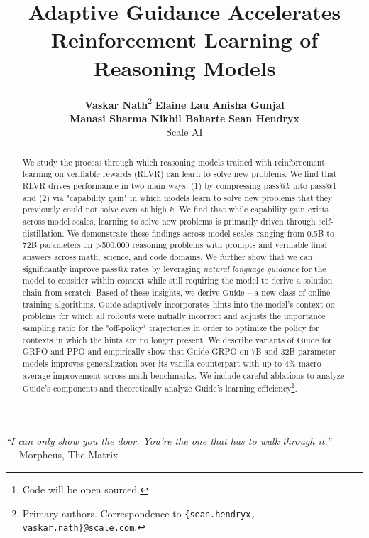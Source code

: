 \documentclass{article}
\title{Adaptive Guidance Accelerates Reinforcement Learning of Reasoning Models}
\author{%
  \textbf{Vaskar Nath}\thanks{Primary authors. Correspondence to \texttt{\{sean.hendryx, vaskar.nath\}@scale.com}.}\quad
  \textbf{Elaine Lau}\quad
  \textbf{Anisha Gunjal}\\[3pt]
  \textbf{Manasi Sharma}\quad
  \textbf{Nikhil Baharte}\quad
  \textbf{Sean Hendryx}\footnotemark[1]\\[6pt]
  Scale AI
}
\begin{document}
\maketitle

\begin{abstract}
   We study the process through which reasoning models trained with reinforcement learning on verifiable rewards (RLVR) can learn to solve new problems. We find that RLVR drives performance in two main ways:
   (1) by compressing pass@$k$ into pass@1 and (2) via "capability gain" in which models learn to solve new problems that they previously could not solve even at high $k$. We find that while capability gain exists across model scales, learning to solve new problems is primarily driven through self-distillation. We demonstrate these findings across model scales ranging from 0.5B to 72B parameters on >500,000 reasoning problems with prompts and verifiable final answers across math, science, and code domains. We further show that we can significantly improve pass@$k$ rates by leveraging \textit{natural language guidance} for the model to consider within context while still requiring the model to derive a solution chain from scratch. 
   Based of these insights, we derive $\text{Guide}$ -- a new class of online training algorithms. 
   $\text{Guide}$ adaptively incorporates hints into the model's context on problems for which all rollouts were initially incorrect and adjusts the importance sampling ratio for the "off-policy" trajectories in order to optimize the policy for contexts in which the hints are no longer present. We describe variants of $\text{Guide}$ for GRPO and PPO and empirically show that Guide-GRPO on 7B and 32B parameter models improves generalization over its vanilla counterpart with up to 4\% macro-average improvement across math benchmarks. We include careful ablations to analyze $\text{Guide}$'s components and theoretically analyze Guide's learning efficiency\footnote{Code will be open sourced.}.
\end{abstract}

\begin{flushright}
\textit{``I can only show you the door. You're the one that has to walk through it.''} \\
\vspace{0.1cm}
--- Morpheus, The Matrix
\end{flushright}
\end{document}
